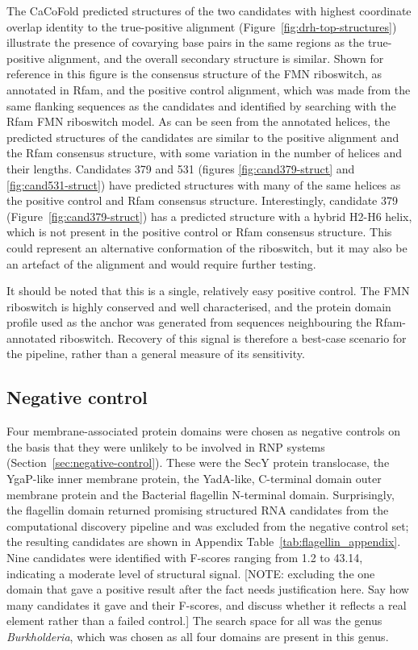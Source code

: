 The CaCoFold predicted structures of the two candidates with highest coordinate overlap identity to the true-positive alignment (Figure~\ref{fig:drh-top-structures}) illustrate the presence of covarying base pairs in the same regions as the true-positive alignment, and the overall secondary structure is similar.
Shown for reference in this figure is the consensus structure of the \ac{FMN} riboswitch, as annotated in Rfam, and the positive control alignment, which was made from the same flanking sequences as the candidates and identified by searching with the Rfam \ac{FMN} riboswitch model.
As can be seen from the annotated helices, the predicted structures of the candidates are similar to the positive alignment and the Rfam consensus structure, with some variation in the number of helices and their lengths.
Candidates 379 and 531 (figures \ref{fig:cand379-struct} and \ref{fig:cand531-struct}) have predicted structures with many of the same helices as the positive control and Rfam consensus structure.
Interestingly, candidate 379 (Figure~\ref{fig:cand379-struct}) has a predicted structure with a hybrid H2-H6 helix, which is not present in the positive control or Rfam consensus structure.
This could represent an alternative conformation of the riboswitch, but it may also be an artefact of the alignment and would require further testing.

It should be noted that this is a single, relatively easy positive control.
The \ac{FMN} riboswitch is highly conserved and well characterised, and the protein domain profile used as the anchor was generated from sequences neighbouring the Rfam-annotated riboswitch.
Recovery of this signal is therefore a best-case scenario for the pipeline, rather than a general measure of its sensitivity.

\subsection{Negative control}

Four membrane-associated protein domains were chosen as negative controls on the basis that they were unlikely to be involved in \ac{RNP} systems (Section~\ref{sec:negative-control}).
These were the SecY protein translocase, the YgaP-like inner membrane protein, the YadA-like, C-terminal domain outer membrane protein and the Bacterial flagellin N-terminal domain.
Surprisingly, the flagellin domain returned promising structured RNA candidates from the computational discovery pipeline and was excluded from the negative control set; the resulting candidates are shown in Appendix Table~\ref{tab:flagellin_appendix}. 
Nine candidates were identified with F-scores ranging from 1.2 to 43.14, indicating a moderate level of structural signal.
 [NOTE: excluding the one domain that gave a positive result after the fact needs justification here. Say how many candidates it gave and their F-scores, and discuss whether it reflects a real element rather than a failed control.]
The search space for all was the genus \emph{Burkholderia}, which was chosen as all four domains are present in this genus.

